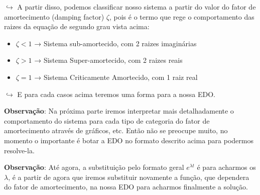 \documentclass[]{article}
\providecommand{\tightlist}{%
  \setlength{\itemsep}{0pt}\setlength{\parskip}{0pt}}
\begin{document}
  \(\hookrightarrow\) A partir disso, podemos classificar nosso sistema a
  partir do valor do fator de amortecimento (damping factor) \(\zeta\),
  pois é o termo que rege o comportamento das raizes da equação de segundo
  grau vista acima:

  \begin{itemize}
  \tightlist
  \item
    \(\zeta < 1\) → Sistema sub-amortecido, com 2 raizes imaginárias
  \item
    \(\zeta > 1\) → Sistema Super-amortecido, com 2 raizes reais
  \item
    \(\zeta = 1\) → Sistema Criticamente Amortecido, com 1 raiz real
  \end{itemize}

  \(\hookrightarrow\) E para cada casos acima teremos uma forma para a
  nossa EDO.

  \textbf{Observação}: Na próxima parte iremos interpretar mais
  detalhadamente o comportamento do sistema para cada tipo de categoria do
  fator de amortecimento através de gráficos, etc. Então não se preocupe
  muito, no momento o importante é botar a EDO no formato descrito acima
  para podermos resolve-la.

  \textbf{Observação}: Até agora, a substituição pelo formato geral
  \(e^{\lambda t}\) é para acharmos os \(\lambda\), é a partir de agora
  que iremos substituir novamente a função, que dependera do fator de
  amortecimento, na nossa EDO para acharmos finalmente a solução.
\end{document}
